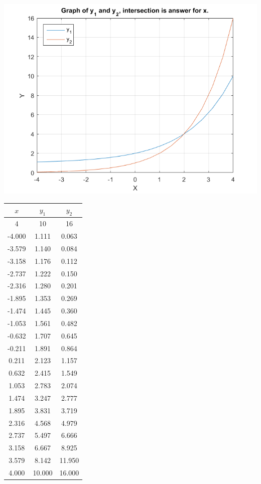 \documentclass[12pt]{article}
\begin{document}
\begin{enumerate}[label=\textbf{\arabic*}.]
\begin{minipage}{.68\linewidth}
\includegraphics[scale=0.60]{Part2Graph.png}
\end{minipage}
\begin{minipage}{.3\linewidth}
\begin{tabular}{c | c | c}
$x$ & $y_1$ & $y_2$ \\
\hline
4	&	10	&	16 \\
\hline
-4.000	&	1.111	&	0.063	\\
\hline
-3.579	&	1.140	&	0.084	\\
\hline
-3.158	&	1.176	&	0.112	\\
\hline
-2.737	&	1.222	&	0.150	\\
\hline
-2.316	&	1.280	&	0.201	\\
\hline
-1.895	&	1.353	&	0.269	\\
\hline
-1.474	&	1.445	&	0.360	\\
\hline
-1.053	&	1.561	&	0.482	\\
\hline
-0.632	&	1.707	&	0.645	\\
\hline
-0.211	&	1.891	&	0.864	\\
\hline
0.211	&	2.123	&	1.157	\\
\hline
0.632	&	2.415	&	1.549	\\
\hline
1.053	&	2.783	&	2.074	\\
\hline
1.474	&	3.247	&	2.777	\\
\hline
\rowcolor{yellow!50}1.895	&	3.831	&	3.719	\\
\hline
\rowcolor{yellow!50}2.316	&	4.568	&	4.979	\\
\hline
2.737	&	5.497	&	6.666	\\
\hline
3.158	&	6.667	&	8.925	\\
\hline
3.579	&	8.142	&	11.950	\\
\hline
4.000	&	10.000	&	16.000	\\
\end{tabular}


\end{minipage}
\end{enumerate}
\end{document}
